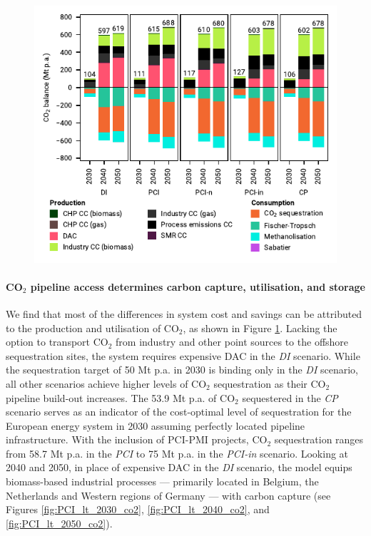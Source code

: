 \documentclass[pdflatex,sn-nature]{sn-jnl}%
\theoremstyle{thmstyleone}%
\theoremstyle{thmstyletwo}%
\theoremstyle{thmstylethree}%
\begin{document}
\begin{figure}[htbp]
  \centering
  \includegraphics{figures/balances_overview_co2 stored}
  \label{fig:balances_overview_co2_stored}
\end{figure}

\paragraph{CO$_2$ pipeline access determines carbon capture, utilisation, and storage}
We find that most of the differences in system cost and savings can be attributed to the production and utilisation of CO$_2$, as shown in Figure \ref{fig:balances_overview_co2_stored}. Lacking the option to transport CO$_2$ from industry and other point sources to the offshore sequestration sites, the system requires expensive DAC in the \textit{DI} scenario. While the sequestration target of 50 Mt p.a. in 2030 is binding only in the \textit{DI} scenario, all other scenarios achieve higher levels of CO$_2$ sequestration as their CO$_2$ pipeline build-out increases. 
The 53.9 Mt p.a. of CO$_2$ sequestered in the \textit{CP} scenario serves as an indicator of the cost-optimal level of sequestration for the European energy system in 2030 assuming perfectly located pipeline infrastructure. With the inclusion of PCI-PMI projects, CO$_2$ sequestration ranges from 58.7 Mt p.a. in the \textit{PCI} to 75 Mt p.a. in the \textit{PCI-in} scenario. 
Looking at 2040 and 2050, in place of expensive DAC in the \textit{DI} scenario, the model equips biomass-based industrial processes --- primarily located in Belgium, the Netherlands and Western regions of Germany --- with carbon capture (see Figures \ref{fig:PCI_lt_2030_co2}, \ref{fig:PCI_lt_2040_co2}, and \ref{fig:PCI_lt_2050_co2}). 
\end{document}
